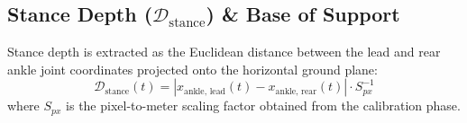 \subsection{Stance Depth ($\mathcal{D}_{\text{stance}}$) \& Base of Support}
Stance depth is extracted as the Euclidean distance between the lead and rear ankle joint coordinates projected onto the horizontal ground plane:
\begin{equation}
    \mathcal{D}_{\text{stance}}(t) = \left| x_{\text{ankle, lead}}(t) - x_{\text{ankle, rear}}(t) \right| \cdot S_{px}^{-1}
\end{equation}
where $S_{px}$ is the pixel-to-meter scaling factor obtained from the calibration phase.
